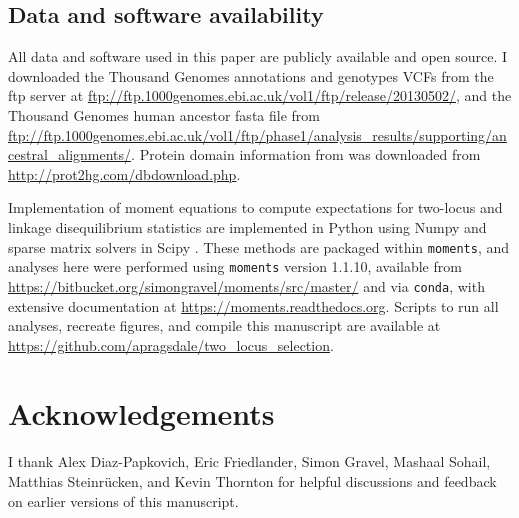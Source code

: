 \documentclass[]{article}
\begin{document}
\subsection{Data and software availability}
\label{data-and-software-availability}

All data and software used in this paper are publicly available and open
source. I downloaded the Thousand Genomes annotations and genotypes VCFs from
the ftp server at
\url{ftp://ftp.1000genomes.ebi.ac.uk/vol1/ftp/release/20130502/}, and the
Thousand Genomes human ancestor fasta file from
\url{ftp://ftp.1000genomes.ebi.ac.uk/vol1/ftp/phase1/analysis_results/supporting/ancestral_alignments/}.
Protein domain information from \citet{Stanek2020-pa} was downloaded from
\url{http://prot2hg.com/dbdownload.php}.

Implementation of moment equations to compute expectations for two-locus and
linkage disequilibrium statistics are implemented in Python using Numpy
\citep{Harris2020-pc} and sparse matrix solvers in Scipy
\citep{Virtanen2020-kr}. These methods are packaged within \texttt{moments},
and analyses here were performed using \texttt{moments} version 1.1.10,
available from \url{https://bitbucket.org/simongravel/moments/src/master/} and
via \texttt{conda}, with extensive documentation at
\url{https://moments.readthedocs.org}. Scripts to run all analyses, recreate
figures, and compile this manuscript are available at
\url{https://github.com/apragsdale/two_locus_selection}.

\section{Acknowledgements}\label{acknowledgements}

I thank Alex Diaz-Papkovich, Eric Friedlander, Simon Gravel, Mashaal Sohail,
Matthias Steinrücken, and Kevin Thornton for helpful discussions and feedback
on earlier versions of this manuscript.

  

\end{document}
